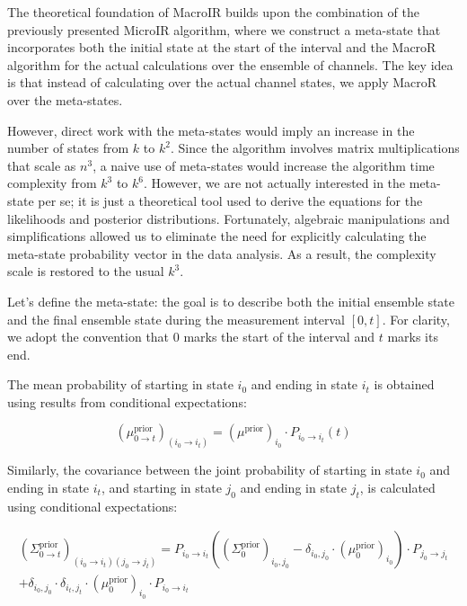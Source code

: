 \documentclass[pdflatex,sn-mathphys-num]{sn-jnl}%
\theoremstyle{thmstyleone}%
\theoremstyle{thmstyletwo}%
\theoremstyle{thmstylethree}%
\begin{document}
The theoretical foundation of MacroIR builds upon the combination of the previously presented MicroIR algorithm, where we construct a meta-state that incorporates both the initial state at the start of the interval and the MacroR algorithm for the actual calculations over the ensemble of channels. The key idea is that instead of calculating over the actual channel states, we apply MacroR over the meta-states.

However, direct work with the meta-states would imply an increase in the number of states from $k$ to $k^2$. Since the algorithm involves matrix multiplications that scale as $n^3$, a naive use of meta-states would increase the algorithm time complexity from $k^3$ to $k^6$. However, we are not actually interested in the meta-state per se; it is just a theoretical tool used to derive the equations for the likelihoods and posterior distributions. Fortunately, algebraic manipulations and simplifications allowed us to eliminate the need for explicitly calculating the meta-state probability vector in the data analysis. As a result, the complexity scale is restored to the usual $k^3$.


Let's define the meta-state: the goal is to describe both the initial ensemble state and the final ensemble state during the measurement interval \( [0, t] \). For clarity, we adopt the convention that \( 0 \) marks the start of the interval and \( t \) marks its end.

The mean probability of starting in state \( i_0 \) and ending in state \( i_t \) is obtained using results from conditional expectations:

\begin{equation}
	(\mu^{\text{prior}}_{0 \rightarrow t})_{(i_0 \rightarrow i_t)} = (\mu^{\text{prior}})_{i_0} \cdot P_{i_0 \rightarrow i_t}(t)
	\label{eq:meta_mean_prior}
\end{equation}

Similarly, the covariance between the joint probability of starting in state \( i_0 \) and ending in state \( i_t \), and starting in state \( j_0 \) and ending in state \( j_t \), is calculated using conditional expectations:

\begin{multline}
	(\Sigma^{\text{prior}}_{0 \rightarrow t})_{(i_0 \rightarrow i_t)(j_0 \rightarrow j_t)} = 
	P_{i_0 \rightarrow i_t} \left((\Sigma^{\text{prior}}_0)_{i_0, j_0} - \delta_{i_0, j_0} \cdot (\mu^{\text{prior}}_0)_{i_0}\right) \cdot P_{j_0 \rightarrow j_t} \\
	+ \delta_{i_0, j_0} \cdot \delta_{i_t, j_t} \cdot (\mu^{\text{prior}}_0)_{i_0} \cdot P_{i_0 \rightarrow i_t}
	\label{eq:meta_covariance_prior}
\end{multline}
\end{document}
